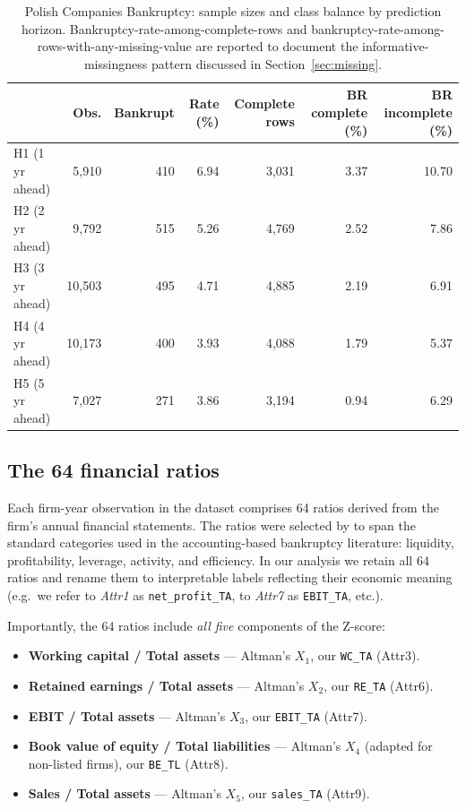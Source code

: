 \documentclass[11pt,a4paper]{article}
\begin{document}
\begin{table}[ht]
\centering
\caption{Polish Companies Bankruptcy: sample sizes and class balance by
prediction horizon. Bankruptcy-rate-among-complete-rows and
bankruptcy-rate-among-rows-with-any-missing-value are reported to document
the informative-missingness pattern discussed in Section~\ref{sec:missing}.}
\label{tab:horizons}
\begin{tabular}{lrrrrrr}
\toprule
 & Obs. & Bankrupt & Rate (\%) & Complete rows & BR complete (\%) & BR incomplete (\%) \\
\midrule
H1 (1 yr ahead) & 5{,}910  & 410 & 6.94 & 3{,}031 & 3.37 & 10.70 \\
H2 (2 yr ahead) & 9{,}792  & 515 & 5.26 & 4{,}769 & 2.52 & 7.86 \\
H3 (3 yr ahead) & 10{,}503 & 495 & 4.71 & 4{,}885 & 2.19 & 6.91 \\
H4 (4 yr ahead) & 10{,}173 & 400 & 3.93 & 4{,}088 & 1.79 & 5.37 \\
H5 (5 yr ahead) & 7{,}027  & 271 & 3.86 & 3{,}194 & 0.94 & 6.29 \\
\bottomrule
\end{tabular}
\end{table}

\subsection{The 64 financial ratios}
\label{sec:ratios}

Each firm-year observation in the dataset comprises 64 ratios derived from
the firm's annual financial statements. The ratios were selected by
\cite{zieba2016} to span the standard categories used in the accounting-based
bankruptcy literature: liquidity, profitability, leverage, activity, and
efficiency. In our analysis we retain all 64 ratios and rename them to
interpretable labels reflecting their economic meaning (e.g.\ we refer to
\textit{Attr1} as \texttt{net\_profit\_TA}, to \textit{Attr7} as
\texttt{EBIT\_TA}, etc.).

Importantly, the 64 ratios include \textit{all five} components of the
\cite{altman1968} Z-score:
\begin{itemize}
\item \textbf{Working capital / Total assets} --- Altman's $X_1$, our
\texttt{WC\_TA} (Attr3).
\item \textbf{Retained earnings / Total assets} --- Altman's $X_2$, our
\texttt{RE\_TA} (Attr6).
\item \textbf{EBIT / Total assets} --- Altman's $X_3$, our \texttt{EBIT\_TA}
(Attr7).
\item \textbf{Book value of equity / Total liabilities} --- Altman's $X_4$
(adapted for non-listed firms), our \texttt{BE\_TL} (Attr8).
\item \textbf{Sales / Total assets} --- Altman's $X_5$, our \texttt{sales\_TA}
(Attr9).
\end{itemize}
\end{document}

